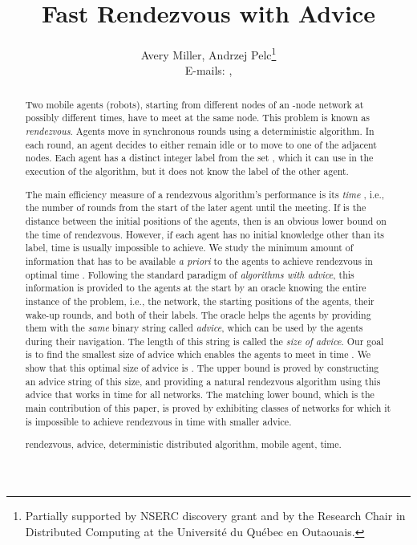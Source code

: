 \documentclass{llncs}
\begin{document}
\title{{\bf Fast Rendezvous with Advice}}
\date{}

\author{
Avery Miller,
Andrzej Pelc\thanks{Partially supported by NSERC discovery grant and by the Research Chair in Distributed Computing at the Universit\'e du Qu\'{e}bec en Outaouais.}\\
E-mails: , \\
}


\date{ }
\maketitle

\begin{abstract}

Two mobile agents (robots), starting from different nodes of an -node network at possibly different times, have to meet at the same node.
This problem is known as {\em rendezvous}.
Agents move in synchronous rounds using a deterministic algorithm.
In each round, an agent decides to either remain
idle or to move to one of the adjacent nodes. 
Each agent has a distinct integer label from the set , which it can
use in the execution of the algorithm, but it does not know the label of the other agent. 

The main efficiency measure of a rendezvous algorithm's performance is its {\em time} , i.e., the number of rounds from the start of the later agent until the meeting.
If  is the distance between the initial positions of the agents, then  is an obvious lower bound on the time of rendezvous. However, if each agent has no initial  knowledge other than its label,
 time  is usually impossible to achieve. We study the minimum amount of information that has to be available  {\em a priori} to the agents to achieve rendezvous in optimal time .
Following the standard paradigm of {\em algorithms
with advice}, this information is provided to the agents at the start by an oracle knowing the entire instance of the problem, i.e., the network, the starting  positions of the agents, their wake-up rounds,  and both of their labels. The oracle
helps the agents by providing them with the {\em same} binary string called {\em advice}, which can be used by the agents during their navigation. The length of this
string is called the {\em size of advice}.  Our goal is to find the smallest size of advice which enables the agents to meet in time . We show that this optimal size of advice is . 
The upper bound is proved by constructing an advice string of this size, and providing a natural rendezvous algorithm using this advice that works in time 
for all networks.
The matching lower bound, which is the main contribution of this paper, is proved by exhibiting classes of networks for which it is impossible to achieve
rendezvous in time 
with smaller advice. 


\vspace{2ex}

 rendezvous, advice, deterministic distributed algorithm, mobile agent, time. 
\end{abstract}
\end{document}
